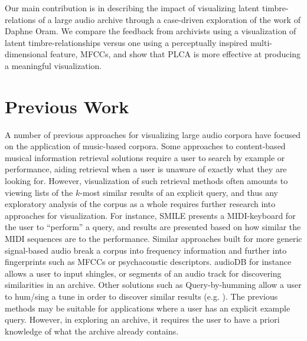 Our main contribution is in describing the impact of visualizing latent timbre-relations of a large audio archive through a case-driven exploration of the work of Daphne Oram.  We compare the feedback from archivists using a visualization of latent timbre-relationships versus one using a perceptually inspired multi-dimensional feature, MFCCs, and show that PLCA is more effective at producing a meaningful visualization.  

\section{Previous Work}\label{sec:previous}

A number of previous approaches for visualizing large audio corpora have focused on the application of music-based corpora.  Some approaches to content-based musical information retrieval solutions require a user to search by example or performance, aiding retrieval when a user is unaware of exactly what they are looking for.  However, visualization of such retrieval methods often amounts to viewing lists of the $k$-most similar results of an explicit query, and thus any exploratory analysis of the corpus as a whole requires further research into approaches for visualization.  For instance, SMILE \cite{Melucci2000} presents a MIDI-keyboard for the user to ``perform'' a query, and results are presented based on how similar the MIDI sequences are to the performance.  Similar approaches built for more generic signal-based audio break a corpus into frequency information and further into fingerprints such as MFCCs or psychacoustic descriptors.  audioDB \cite{Casey2008c,Rhodes2010} for instance allows a user to input shingles, or segments of an audio track for discovering similarities in an archive.  Other solutions such as Query-by-humming allow a user to hum/sing a tune in order to discover similar results (e.g. \cite{Wang2006a,Cartwright}).  The previous methods may be suitable for applications where a user has an explicit example query.  However, in exploring an archive, it requires the user to have a priori knowledge of what the archive already contains.

